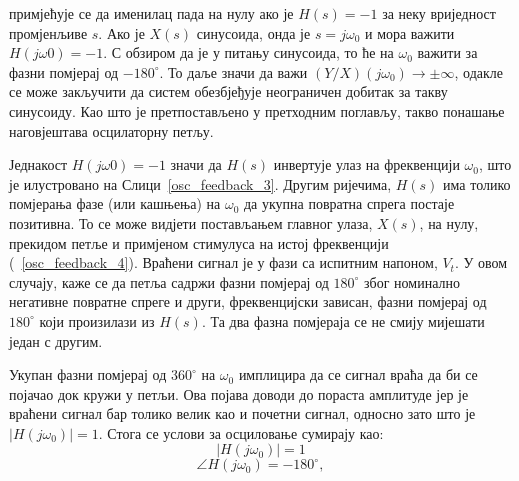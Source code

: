 \documentclass[master]{finthesis}
\begin{document}
примјећује се да именилац пада на нулу ако је $H(s)=-1$ за неку вриједност промјенљиве $s$. Ако је $X(s)$ синусоида, онда је $s=j\omega_{0}$ и мора важити $H(j\omega{0})=-1$. С обзиром да је у питању синусоида, то ће на $\omega_{0}$ важити за фазни помјерај од $-180^{\circ}$. То даље значи да важи $(Y/X)(j\omega_{0}) \rightarrow \pm\infty$, одакле се може закључити да систем обезбјеђује неограничен добитак за такву синусоиду. Као што је претпостављено у претходним поглављу, такво понашање наговјештава осцилаторну петљу. \par
Једнакост $H(j\omega{0})=-1$ значи да $H(s)$ инвертује улаз на фреквенцији $\omega_{0}$, што је илустровано на Слици~\ref{osc_feedback_3}. Другим ријечима, $H(s)$ има толико помјерања фазе (или кашњења) на $\omega_{0}$ да укупна повратна спрега постаје позитивна. То се може видјети постављањем главног улаза, $X(s)$, на нулу, прекидом петље и примјеном стимулуса на истој фреквенцији (\figurename~\ref{osc_feedback_4}). Враћени сигнал је у фази са испитним напоном, $V_{t}$. У овом случају, каже се да петља садржи фазни помјерај од $180^{\circ}$ због номинално негативне повратне спреге и други, фреквенцијски зависан, фазни помјерај од $180^{\circ}$ који произилази из $H(s)$. Та два фазна помјераја се не смију мијешати један с другим. \par


Укупан фазни помјерај од $360^{\circ}$ на $\omega_{0}$ имплицира да се сигнал враћа да би се појачао док кружи у петљи. Ова појава доводи до пораста амплитуде јер је враћени сигнал бар толико велик као и почетни сигнал, односно зато што је $|H(j\omega_{0})|=1$. Стога се услови за осциловање сумирају као:
\begin{equation} 
	\label{osc_condition_1}
	|H(j\omega_{0})| = 1
\end{equation}
\begin{equation} 
	\label{osc_condition_2}
	\angle H(j\omega_{0}) = -180^{\circ},
\end{equation}
\end{document}
